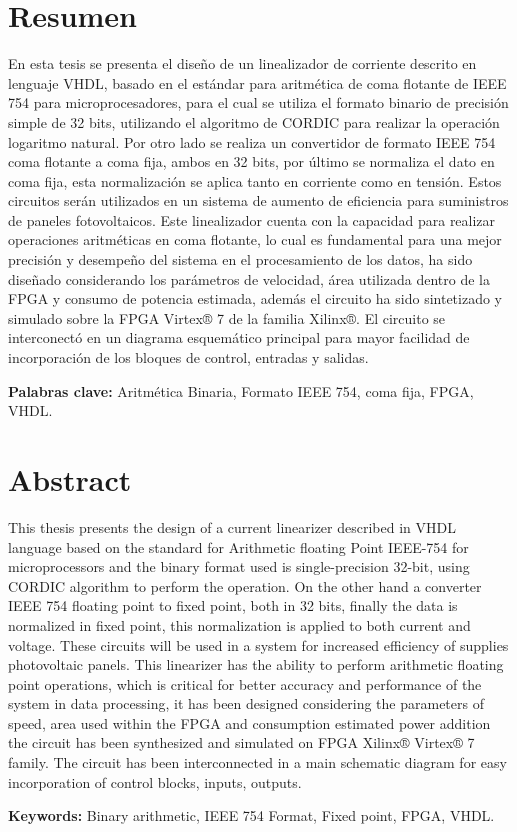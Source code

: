 \chapter*{Resumen}
\thispagestyle{empty}

En esta tesis se presenta el diseño de un linealizador de corriente descrito en lenguaje VHDL, basado en el estándar para aritmética de coma flotante de IEEE 754 para microprocesadores, para el cual se utiliza el formato binario de precisión simple de 32 bits, utilizando el algoritmo de CORDIC para realizar la operación logaritmo natural. Por otro lado se realiza un convertidor de formato IEEE 754 coma flotante a coma fija, ambos en 32 bits, por último se normaliza el dato en coma fija, esta normalización se aplica tanto en corriente como en tensión. Estos circuitos serán utilizados en un sistema de aumento de eficiencia para suministros de paneles fotovoltaicos. Este linealizador cuenta con la capacidad para realizar operaciones aritméticas en coma flotante, lo cual es fundamental para una mejor precisión y desempeño del sistema en el procesamiento de los datos, ha sido diseñado considerando los parámetros de velocidad, área utilizada dentro de la FPGA y consumo de potencia estimada, además el circuito ha sido sintetizado y simulado sobre la FPGA Virtex® 7 de la familia Xilinx®. El circuito se interconectó en un diagrama esquemático principal para mayor facilidad de incorporación de los bloques de control, entradas y salidas.
 

\bigskip

\textbf{Palabras clave:} Aritmética Binaria, Formato IEEE 754, coma fija, FPGA, VHDL.





\clearpage
\chapter*{Abstract}
\thispagestyle{empty}

This thesis presents the design of a current linearizer described in VHDL language based on the standard for Arithmetic floating Point IEEE-754 for microprocessors and the binary format used is single-precision 32-bit, using CORDIC algorithm to perform the operation. On the other hand a converter IEEE 754 floating point to fixed point, both in 32 bits, finally the data is normalized in fixed point, this normalization is applied to both current and voltage. These circuits will be used in a system for  increased efficiency of supplies photovoltaic panels. This linearizer has the ability to perform arithmetic floating point operations, which is critical for better accuracy and performance of the system in data processing, it has been designed considering the parameters of speed, area used within the FPGA and consumption estimated power addition the circuit has been synthesized and simulated on FPGA Xilinx® Virtex® 7 family. The circuit has been interconnected in a main schematic diagram for easy incorporation of control blocks, inputs, outputs.


\bigskip

\textbf{Keywords:} Binary arithmetic, IEEE 754 Format, Fixed point, FPGA, VHDL. 


